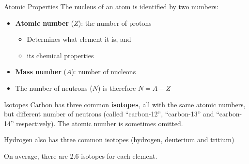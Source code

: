 \documentclass[12pt,compress,aspectratio=169]{beamer}
\begin{document}
  


\begin{frame}{Atomic Properties}
  The nucleus of an atom is identified by two numbers:
  \begin{center}
  \end{center}
  \begin{itemize}
  \item\textbf{Atomic number} ($Z$): the number of protons
    \begin{itemize}
    \item Determines what element it is, and 
    \item its chemical properties
    \end{itemize}
  \item\textbf{Mass number} ($A$): number of nucleons
  \item The number of neutrons ($N$) is therefore $N=A-Z$
  \end{itemize}
\end{frame}



\begin{frame}{Isotopes}
  Carbon has three common \textbf{isotopes}, all with the same atomic numbers,
  but different number of neutrons (called ``carbon-12'', ``carbon-13'' and
  ``carbon-14'' respectively). The atomic number is sometimes omitted.
  

  Hydrogen also has three common isotopes (hydrogen, deuterium and tritium)
  

  On average, there are \num{2.6} isotopes for each element.
\end{frame}
\end{document}
